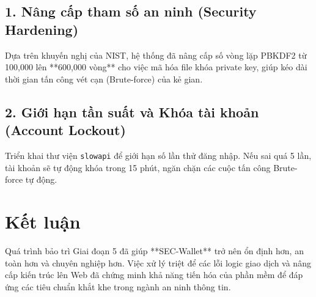 \documentclass[11pt,a4paper]{article}
\begin{document}
\subsection{1. Nâng cấp tham số an ninh (Security Hardening)}
Dựa trên khuyến nghị của NIST, hệ thống đã nâng cấp số vòng lặp PBKDF2 từ 100,000 lên **600,000 vòng** cho việc mã hóa file khóa private key, giúp kéo dài thời gian tấn công vét cạn (Brute-force) của kẻ gian.

\subsection{2. Giới hạn tần suất và Khóa tài khoản (Account Lockout)}
Triển khai thư viện \texttt{slowapi} để giới hạn số lần thử đăng nhập. Nếu sai quá 5 lần, tài khoản sẽ tự động khóa trong 15 phút, ngăn chặn các cuộc tấn công Brute-force tự động.

\section{Kết luận}
Quá trình bảo trì Giai đoạn 5 đã giúp **SEC-Wallet** trở nên ổn định hơn, an toàn hơn và chuyên nghiệp hơn. Việc xử lý triệt để các lỗi logic giao dịch và nâng cấp kiến trúc lên Web đã chứng minh khả năng tiến hóa của phần mềm để đáp ứng các tiêu chuẩn khắt khe trong ngành an ninh thông tin.
\end{document}
